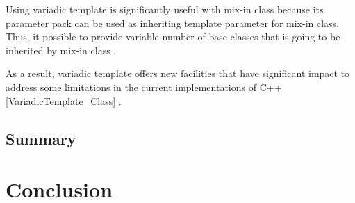 \documentclass[11pt]{report}
\begin{document}
Using variadic template is significantly useful with mix-in class because its parameter pack can be used as inheriting template parameter for mix-in class. Thus, it possible to provide variable number of base classes that is going to be inherited by mix-in class \cite{Gregor:2007:VTC}.


As a result, variadic template offers new facilities that have significant impact to address some limitations in the current implementations of C++ \ref{VariadicTemplate_Class} \cite{Gregor:2007:VTC}.

\section{Summary}
\label{section1: Summary}

\chapter{Conclusion}
\label{sec: conclusion}


	
\end{document}
